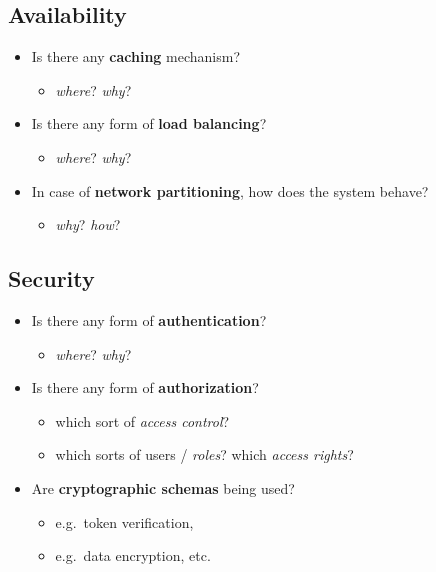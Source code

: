 \documentclass{scrartcl}
\begin{document}
\subsection{Availability}\label{availability}

\begin{itemize}
  \item Is there any \textbf{caching} mechanism?
  \begin{itemize}
    \item \emph{where}? \emph{why}?
  \end{itemize}
  
  \item Is there any form of \textbf{load balancing}?
  \begin{itemize}
    \item \emph{where}? \emph{why}?
  \end{itemize}

  \item In case of \textbf{network partitioning}, how does the system behave?
  \begin{itemize}
    \item \emph{why}? \emph{how}?
  \end{itemize}
\end{itemize}

\subsection{Security}\label{security}

\begin{itemize}
  \item Is there any form of \textbf{authentication}?
  \begin{itemize}
    \item \emph{where}? \emph{why}?
  \end{itemize}

  \item Is there any form of \textbf{authorization}?
  \begin{itemize}
    \item which sort of \emph{access control}?
    \item which sorts of users / \emph{roles}? which \emph{access rights}?
  \end{itemize}

  \item Are \textbf{cryptographic schemas} being used?
  \begin{itemize}
    \item e.g.~token verification,
    \item e.g.~data encryption, etc.
  \end{itemize}
\end{itemize}
\end{document}
